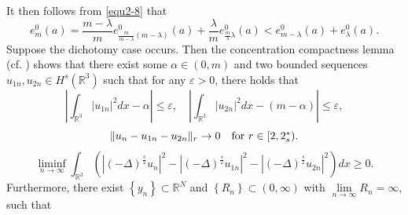 \documentclass[reqno, 11pt]{amsart} %
\numberwithin{equation}{section}
\begin{document}
	It then follows from \eqref{equ2-8} that
	\begin{equation}\label{equ2-9}
		e^{0}_{m}(a)=\frac{m-\lambda}{m}e^{0}_{\frac{m}{m-\lambda}(m-\lambda)}(a)+\frac{\lambda}{m}e^{0}_{\frac{m}{\lambda}\lambda}(a)<e^{0}_{m-\lambda}(a)+e^{0}_{\lambda}(a).
	\end{equation}
	Suppose the dichotomy case occurs. Then the concentration compactness lemma (cf. \cite[Lemma 2.4]{W}) shows that there exist some $\alpha\in (0, m)$ and two bounded sequences $u_{1n}, u_{2n}\in H^{s}(\mathbb{R}^{3})$ such that for any $\varepsilon>0$, there holds that
	\begin{equation*}
		\left|\int_{\mathbb{R}^{3}}\left| u_{1n}\right|^{2}dx-\alpha \right|\leq\varepsilon, \quad \left|\int_{\mathbb{R}^{3}}\left| u_{2n}\right|^{2}dx-\left(m-\alpha  \right) \right|\leq\varepsilon,
	\end{equation*}
	\begin{equation*}
		\|u_{n}-u_{1n}-u_{2n}\|_{r}\rightarrow0\quad \hbox{for $r\in[2, 2_{s}^{\ast})$}.
	\end{equation*}
	\begin{equation*}
		\liminf_{n\rightarrow\infty} \int_{\mathbb{R}^{3}}\left( |(-\Delta)^{\frac{s}{2}} u_{n}|^{2}-|(-\Delta)^{\frac{s}{2}} u_{1n}|^{2}-|(-\Delta)^{\frac{s}{2}} u_{2n}|^{2}\right)dx\geq0.
	\end{equation*}
	Furthermore, there exist $\left\lbrace y_{n}\right\rbrace \subset\mathbb{R}^{N}$ and $\left\lbrace R_{n}\right\rbrace \subset(0, \infty)$ with $\lim\limits_{n\rightarrow\infty}R_{n}=\infty$, such that
	
\end{document}
